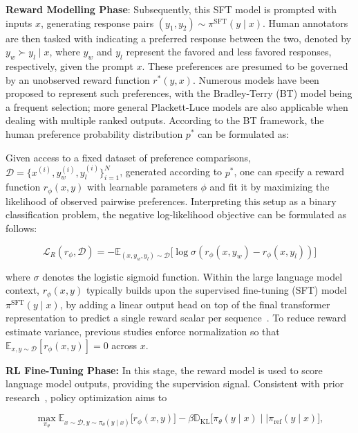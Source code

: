 \textbf{Reward Modelling Phase}: Subsequently, this SFT model is prompted with inputs $x$, generating response pairs $(y_1, y_2)\sim \pi^\text{SFT}(y \mid x)$. Human annotators are then tasked with indicating a preferred response between the two, denoted by $y_w\succ y_l \mid x$, where $y_w$ and $y_l$ represent the favored and less favored responses, respectively, given the prompt $x$. These preferences are presumed to be governed by an unobserved reward function $r^*(y, x)$. Numerous models have been proposed to represent such preferences, with the Bradley-Terry (BT) \cite{bradley1952rankanalysis} model being a frequent selection; more general Plackett-Luce models \citep{plackett1975analysis, luce2012individual} are also applicable when dealing with multiple ranked outputs. According to the BT framework, the human preference probability distribution $p^*$ can be formulated as:

Given access to a fixed dataset of preference comparisons, $\mathcal{D}=\bigl\{x^{(i)}, y_w^{(i)}, y_l^{(i)}\bigr\}_{i=1}^N$, generated according to $p^*$, one can specify a reward function $r_{\phi}(x, y)$ with learnable parameters $\phi$ and fit it by maximizing the likelihood of observed pairwise preferences. Interpreting this setup as a binary classification problem, the negative log-likelihood objective can be formulated as follows:

\begin{equation}\label{eq:reward_model}
    \mathcal{L}_R(r_{\phi}, \mathcal{D}) = -\mathbb{E}_{(x, y_w, y_l)\sim \mathcal{D}}\bigl[\log \sigma(r_{\phi}(x, y_w)- r_{\phi}(x, y_l))\bigr]
\end{equation}

where $\sigma$ denotes the logistic sigmoid function. Within the large language model context, $r_{\phi}(x, y)$ typically builds upon the supervised fine-tuning (SFT) model $\pi^\text{SFT}(y \mid x)$, by adding a linear output head on top of the final transformer representation to predict a single reward scalar per sequence~\cite{ziegler2020finetuning}. To reduce reward estimate variance, previous studies enforce normalization so that $\mathbb{E}_{x,y\sim \mathcal{D}}\left[r_\phi(x, y)\right] = 0$ across $x$.

\textbf{RL Fine-Tuning Phase:} In this stage, the reward model is used to score language model outputs, providing the supervision signal. Consistent with prior research~\citep{jaques2017sequence, jaques2020human}, policy optimization aims to

\begin{equation}\label{eq:RL}
\max_{\pi_{\theta}}  \mathbb{E}_{x\sim \mathcal{D}, y\sim \pi_{\theta}(y \mid x)}\bigl[r_{\phi}(x, y)\bigr] - \beta\mathbb{D}_{\textrm{KL}}\bigl[\pi_{\theta}(y\mid x)\mid \mid \pi_\text{ref}(y\mid x)\bigr],
\end{equation}

